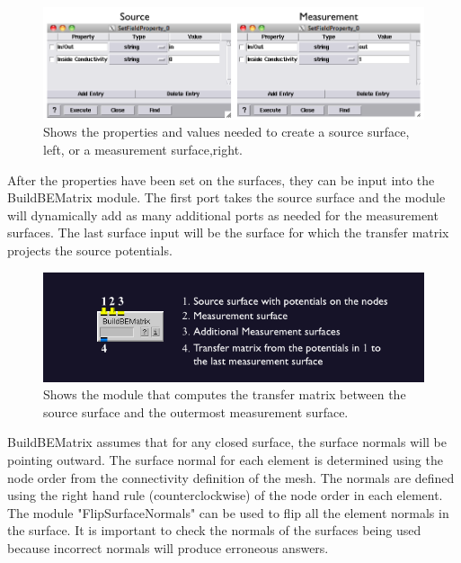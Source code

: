 \begin{figure}[H]
\begin{center}
\includegraphics[width=\textwidth]{ECGToolkitGuide_figures/SetFieldPropGUI.png}
\caption{Shows the properties and values needed to create a source surface, left, or a 
measurement surface,right.}
\label{SetFieldPropGUI}
\end{center}
\end{figure}

After the properties have been set on the surfaces, they can be input into the BuildBEMatrix
module.  The first port takes the source surface and the module will dynamically add as many
additional ports as needed for the measurement surfaces.  The last surface input will be the surface
for which the transfer matrix projects the source potentials. 

\begin{figure}[H]
\begin{center}
\includegraphics[width=\textwidth]{ECGToolkitGuide_figures/BEMmod.png}
\caption{Shows the module that computes the transfer matrix between the source surface
and the outermost measurement surface.}
\label{BEM}
\end{center}
\end{figure}

BuildBEMatrix assumes that for any closed surface, the surface normals will be pointing outward. The surface
normal for each element is determined using the node order from the connectivity definition of the mesh. The 
normals are defined using the right hand rule (counterclockwise) of the node order in each element. The 
module "FlipSurfaceNormals" can be used to flip all the element normals in the surface. It is important to check
the normals of the surfaces being used because incorrect normals will produce erroneous answers. 


